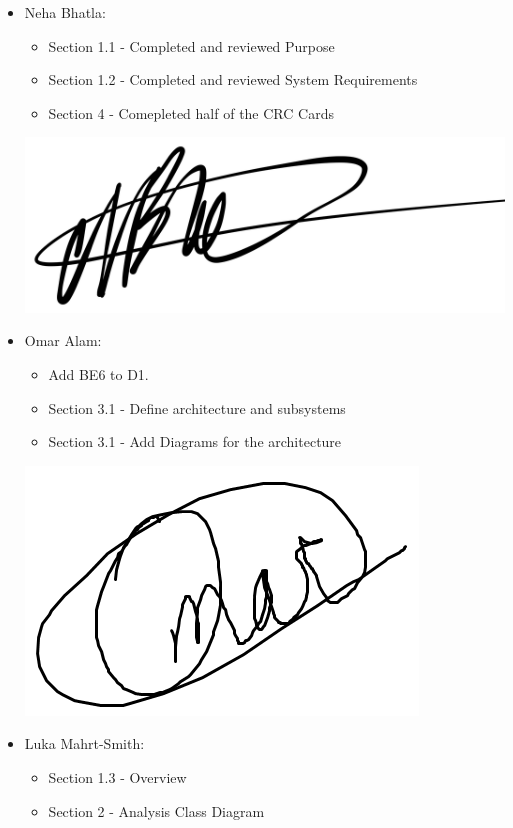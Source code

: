 \documentclass[]{article}
\begin{document}
\begin{itemize}
	\item Neha Bhatla:
	\begin{itemize} 
		\item Section 1.1 - Completed and reviewed Purpose
		\item Section 1.2 - Completed and reviewed System Requirements
		\item Section 4 - Comepleted half of the CRC Cards
	\end{itemize}
	\includegraphics[scale=0.1]{neha_signature.jpeg}\\ 
	\item Omar Alam:
	\begin{itemize}
		\item Add BE6 to D1.
		\item Section 3.1 - Define architecture and subsystems
		\item Section 3.1 - Add Diagrams for the architecture
	\end{itemize}
	\includegraphics[scale=0.3]{omar-signature.png}\\
	\item Luka Mahrt-Smith:
	\begin{itemize}
		\item Section 1.3 - Overview
		\item Section 2 - Analysis Class Diagram

\end{itemize}
\end{itemize}
\end{document}
